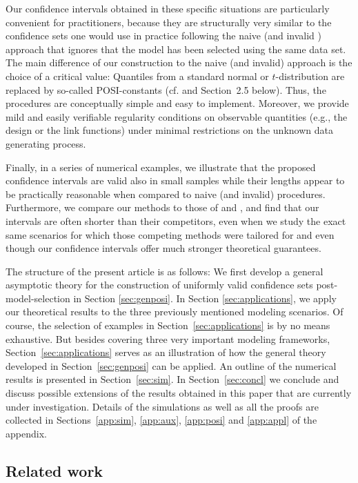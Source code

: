 \documentclass[preprint]{imsart}
\numberwithin{equation}{section}
\begin{document}
Our confidence intervals obtained in these specific situations are particularly convenient for practitioners, because they are structurally very similar to the confidence sets one would use in practice following the naive (and invalid \citep[see, e.g.,][]{leeb13various, bachoc14valid}) approach that ignores that the model has been selected using the same data set. The main difference of our construction to the naive (and invalid) approach is the choice of a critical value: Quantiles from a standard normal or $t$-distribution are replaced by so-called POSI-constants (cf. \cite{Berk13} and Section~2.5 below). Thus, the procedures are conceptually simple and easy to implement. Moreover, we provide mild and easily verifiable regularity conditions on observable quantities (e.g., the design or the link functions) under minimal restrictions on the unknown data generating process.

Finally, in a series of numerical examples, we illustrate that the proposed confidence intervals are valid also in small samples while their lengths appear to be practically reasonable when compared to naive (and invalid) procedures. Furthermore, we compare our methods to those of \cite{Tib15a} and \cite{taylor17post}, and find that our intervals are often shorter than their competitors, even when we study the exact same scenarios for which those competing methods were tailored for and even though our confidence intervals offer much stronger theoretical guarantees.

The structure of the present article is as follows: We first develop a general asymptotic theory for the construction of uniformly valid confidence sets post-model-selection in Section \ref{sec:genposi}. In Section \ref{sec:applications}, we apply our theoretical results to the three previously mentioned modeling scenarios. Of course, the selection of examples in Section~\ref{sec:applications} is by no means exhaustive. But besides covering three very important modeling frameworks, Section~\ref{sec:applications} serves as an illustration of how the general theory developed in Section~\ref{sec:genposi} can be applied. An outline of the numerical results is presented in Section~\ref{sec:sim}. In Section~\ref{sec:concl} we conclude and discuss possible extensions of the results obtained in this paper that are currently under investigation. Details of the simulations as well as all the proofs are collected in Sections~\ref{app:sim}, \ref{app:aux}, \ref{app:posi} and \ref{app:appl} of the appendix.


\subsection{Related work}
\end{document}
